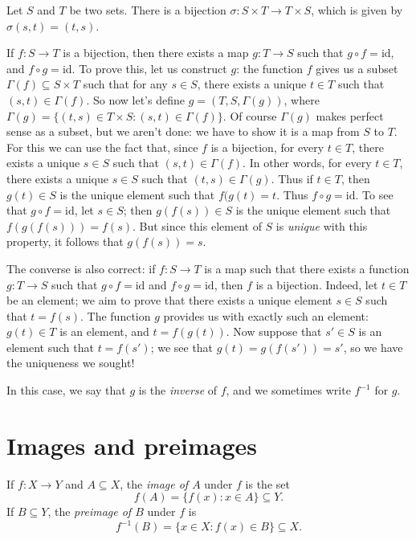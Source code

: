 \documentclass[11pt,dvipsnames]{book}
\numberwithin{figure}{section} %
\numberwithin{table}{section} %
\begin{document}
\begin{example}
	Let $S$ and $T$ be two sets.
	There is a bijection $ \sigma \colon S \times T \to T \times S $, which is given by $\sigma(s,t) = (t,s)$.
\end{example}

If $ f \colon S \to T $ is a bijection, then there exists a map $ g \colon T \to S $ such that $g \circ f = \mathrm{id} $, and $f \circ g = \mathrm{id}$.
To prove this, let us construct $g$:
the function $f $ gives us a subset $\Gamma(f) \subseteq S \times T$ such that for any $s \in S$, there exists a unique $ t \in T$ such that $(s, t) \in \Gamma(f)$.
So now let's define $g = (T, S, \Gamma(g))$, where $\Gamma(g) = \{ (t,s) \in T \times S : (s, t) \in \Gamma(f) \}$.
Of course $\Gamma(g)$ makes perfect sense as a subset, but we aren't done:
we have to show it is a map from $S$ to $T$.
For this we can use the fact that, since $f$ is a bijection, for every $t \in T$, there exists a unique $s \in S $ such that $(s,t) \in \Gamma(f)$.
In other words, for every $t \in T$, there exists a unique $s \in S $ such that $(t,s) \in \Gamma(g)$.
Thus if $t \in T$, then $g(t) \in S$ is the unique element such that $f(g(t) = t$.
Thus $f \circ g = \mathrm{id}$.
To see that $g \circ f = \mathrm{id}$, let $ s \in S$;
then $g(f(s)) \in S$ is the unique element such that $f(g(f(s))) = f(s)$.
But since this element of $S$ is \emph{unique} with this property, it follows that $g(f(s)) = s $.

The converse is also correct: if $f \colon S \to T$ is a map such that there exists a function $g \colon T \to S $ such that $g \circ f =\mathrm{id} $ and $f \circ g = \mathrm{id}$, then $f$ is a bijection.
Indeed, let $t \in T$ be an element;
we aim to prove that there exists a unique element $ s \in S$ such that $t = f(s)$.
The function $g$ provides us with exactly such an element: $g(t) \in T$ is an element, and $t = f(g(t))$.
Now suppose that $s'\in S$ is an element such that $t = f(s')$;
we see that $g(t) = g(f(s')) = s'$, so we have the uniqueness we sought!

In this case, we say that $g$ is the \emph{inverse} of $f$, and we sometimes write $f^{-1}$ for $g$.

\section{Images and preimages}

\begin{definition}
If $f\colon X\rightarrow Y$ and $A\subseteq X$,  the  \emph{image of $A$} under $f$ is  the set
\[
  f(A)=\{f(x):x\in A\} \subseteq Y.
\]
If $B\subseteq Y$, the  \emph{preimage of $B$} under $f$ is
\[
f^{-1}(B)=\{x\in X: f(x)\in B\} \subseteq X.
\]
\end{definition}
\end{document}
